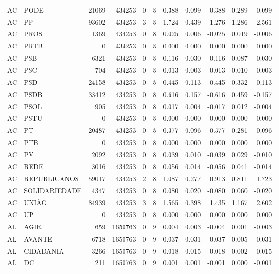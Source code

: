 \begin{landscape}
\begin{longtable}{llrrrrrrrrr}
AC & PODE & 21069 & 434253 & 0 & 8 & 0.388 & 0.099 & -0.388 & 0.289 & -0.099 \\
AC & PP & 93602 & 434253 & 3 & 8 & 1.724 & 0.439 & 1.276 & 1.286 & 2.561 \\
AC & PROS & 1369 & 434253 & 0 & 8 & 0.025 & 0.006 & -0.025 & 0.019 & -0.006 \\
AC & PRTB & 0 & 434253 & 0 & 8 & 0.000 & 0.000 & 0.000 & 0.000 & 0.000 \\
AC & PSB & 6321 & 434253 & 0 & 8 & 0.116 & 0.030 & -0.116 & 0.087 & -0.030 \\
AC & PSC & 704 & 434253 & 0 & 8 & 0.013 & 0.003 & -0.013 & 0.010 & -0.003 \\
AC & PSD & 24158 & 434253 & 0 & 8 & 0.445 & 0.113 & -0.445 & 0.332 & -0.113 \\
AC & PSDB & 33412 & 434253 & 0 & 8 & 0.616 & 0.157 & -0.616 & 0.459 & -0.157 \\
AC & PSOL & 905 & 434253 & 0 & 8 & 0.017 & 0.004 & -0.017 & 0.012 & -0.004 \\
AC & PSTU & 0 & 434253 & 0 & 8 & 0.000 & 0.000 & 0.000 & 0.000 & 0.000 \\
AC & PT & 20487 & 434253 & 0 & 8 & 0.377 & 0.096 & -0.377 & 0.281 & -0.096 \\
AC & PTB & 0 & 434253 & 0 & 8 & 0.000 & 0.000 & 0.000 & 0.000 & 0.000 \\
AC & PV & 2092 & 434253 & 0 & 8 & 0.039 & 0.010 & -0.039 & 0.029 & -0.010 \\
AC & REDE & 3016 & 434253 & 0 & 8 & 0.056 & 0.014 & -0.056 & 0.041 & -0.014 \\
AC & REPUBLICANOS & 59017 & 434253 & 2 & 8 & 1.087 & 0.277 & 0.913 & 0.811 & 1.723 \\
AC & SOLIDARIEDADE & 4347 & 434253 & 0 & 8 & 0.080 & 0.020 & -0.080 & 0.060 & -0.020 \\
AC & UNIÃO & 84939 & 434253 & 3 & 8 & 1.565 & 0.398 & 1.435 & 1.167 & 2.602 \\
AC & UP & 0 & 434253 & 0 & 8 & 0.000 & 0.000 & 0.000 & 0.000 & 0.000 \\
AL & AGIR & 659 & 1650763 & 0 & 9 & 0.004 & 0.003 & -0.004 & 0.001 & -0.003 \\
AL & AVANTE & 6718 & 1650763 & 0 & 9 & 0.037 & 0.031 & -0.037 & 0.005 & -0.031 \\
AL & CIDADANIA & 3266 & 1650763 & 0 & 9 & 0.018 & 0.015 & -0.018 & 0.002 & -0.015 \\
AL & DC & 211 & 1650763 & 0 & 9 & 0.001 & 0.001 & -0.001 & 0.000 & -0.001 \\

\end{longtable}
\end{landscape}
